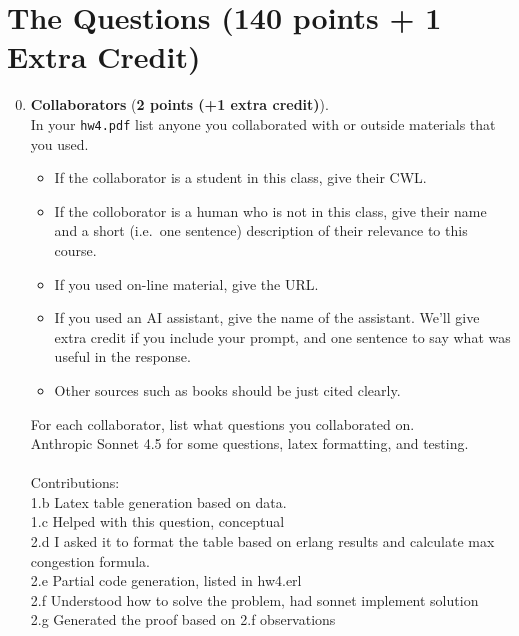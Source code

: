 \documentclass{article}
\newenvironment{answer}
{\color{blue}}
{\normalfont}
\begin{document}
\section{The Questions (140 points + 1 Extra Credit)}
\begin{enumerate}\setcounter{enumi}{-1}
    \item \textbf{Collaborators} (\textbf{2 points (+1 extra credit)}).\label{q:collab}\\
          In your \texttt{hw4.pdf} list anyone you collaborated with or outside materials that you used.
          \begin{itemize}
              \item If the collaborator is a student in this class, give their CWL.
              \item If the colloborator is a human who is not in this class, give their name
                    and a short (i.e.\ one sentence) description of their relevance to this course.
              \item If you used on-line material, give the URL.
              \item If you used an AI assistant, give the name of the assistant.
                    We'll give extra credit if you include your prompt, and one sentence to say
                    what was useful in the response.
              \item Other sources such as books should be just cited clearly.
          \end{itemize}
          For each collaborator, list what questions you collaborated on. \\
          \begin{answer}
              Anthropic Sonnet 4.5 for some questions, latex formatting, and testing. \\
              \\
              Contributions: \\
              1.b Latex table generation based on data. \\
              1.c Helped with this question, conceptual \\
              2.d I asked it to format the table based on erlang results and calculate max congestion formula. \\
              2.e Partial code generation, listed in hw4.erl \\
              2.f Understood how to solve the problem, had sonnet implement solution \\
              2.g Generated the proof based on 2.f observations \\

\end{answer}
\end{enumerate}
\end{document}

